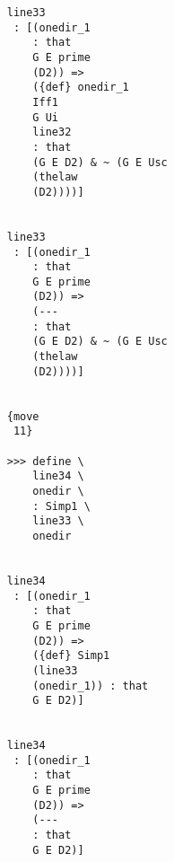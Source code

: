 \documentclass[12pt]{article}
\begin{document}
\begin{verbatim}
                                    line33 
                                     : [(onedir_1 
                                        : that 
                                        G E prime 
                                        (D2)) => 
                                        ({def} onedir_1 
                                        Iff1 
                                        G Ui 
                                        line32 
                                        : that 
                                        (G E D2) & ~ (G E Usc 
                                        (thelaw 
                                        (D2))))]


                                    line33 
                                     : [(onedir_1 
                                        : that 
                                        G E prime 
                                        (D2)) => 
                                        (--- 
                                        : that 
                                        (G E D2) & ~ (G E Usc 
                                        (thelaw 
                                        (D2))))]


                                    {move 
                                     11}

                                    >>> define \
                                        line34 \
                                        onedir \
                                        : Simp1 \
                                        line33 \
                                        onedir


                                    line34 
                                     : [(onedir_1 
                                        : that 
                                        G E prime 
                                        (D2)) => 
                                        ({def} Simp1 
                                        (line33 
                                        (onedir_1)) : that 
                                        G E D2)]


                                    line34 
                                     : [(onedir_1 
                                        : that 
                                        G E prime 
                                        (D2)) => 
                                        (--- 
                                        : that 
                                        G E D2)]



\end{verbatim}
\end{document}

